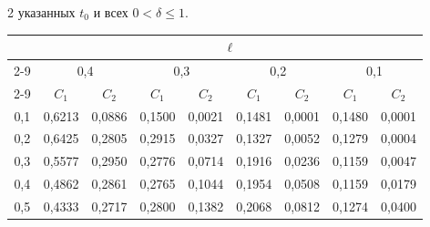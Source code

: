 \begin{multicols}{2}
{указанных $t_0$ и всех ${0<\delta\le 1}$.}





\setcounter{table}{6}


\begin{table}[b]\small %


\begin{center}




\vspace*{2ex}





\tabcolsep=14.4pt


\begin{tabular}{|c|c|c|c|c|c|c|c|c|}


\hline


 & \multicolumn {8}{c|}{$\ell$}\\


 \cline{2-9}


&\multicolumn{2}{c|}{0,4}& \multicolumn{2}{c|}{0,3}& \multicolumn{2}{c|}{0,2}& \multicolumn{2}{c|}{0,1}\\


\cline{2-9}


\multicolumn{1}{|c|}{\raisebox{10pt}[0pt][0pt]{$\delta$}}& $C_1$&$C_2$&$ C_1$&$C_2$&$ C_1$&$C_2$&$ C_1$&$C_2$\\


\hline


0,1 &   0,6213  &   0,0886  &   0,1500  &   0,0021  &   0,1481  &    0,0001 &   0,1480  &   0,0001  \\


0,2 &   0,6425  &   0,2805  &   0,2915  &   0,0327  &   0,1327  &    0,0052 &   0,1279  &   0,0004  \\


0,3 &   0,5577  &   0,2950  &   0,2776  &   0,0714  &   0,1916  &    0,0236 &   0,1159  &   0,0047  \\


0,4 &   0,4862  &   0,2861  &   0,2765  &   0,1044  &   0,1954  &    0,0508 &   0,1159  &   0,0179  \\


0,5 &   0,4333  &   0,2717  &   0,2800  &   0,1382  &   0,2068  &    0,0812 &   0,1274  &   0,0400  \\



\end{tabular}
\end{center}
\end{table}
\end{multicols}
